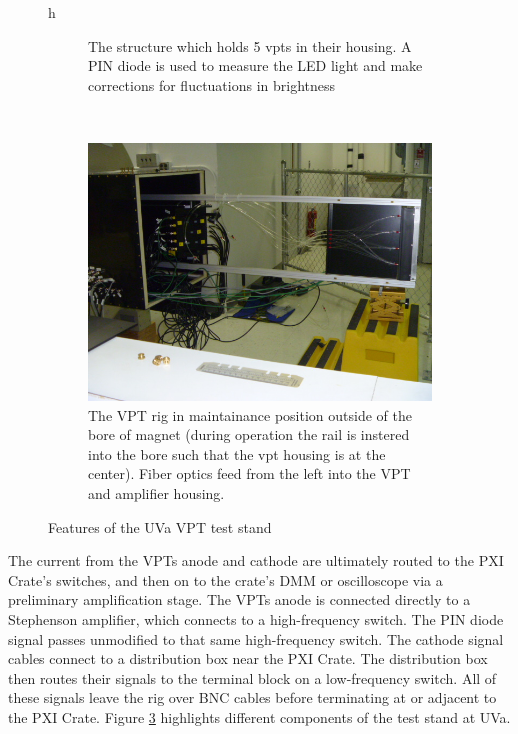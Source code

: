 \begin{figure}{h}
\begin{subfigure}[h]{0.450\textwidth}
        \caption{The structure which holds 5 vpts in their housing.
          A PIN diode is used to measure the LED light and make
          corrections for fluctuations in brightness}\label{fig:uva_vpt_rig_pin_and_house}
      \end{subfigure}
      ~ %
    \begin{subfigure}[h]{0.650\textwidth}
        \includegraphics[width=\textwidth]{Figures/CMS_Diagrams/UVaRig__Amplifier_and_Fibers.JPG}
        \caption{The VPT rig in maintainance position outside of the
          bore of magnet (during operation the rail is instered into
          the bore such that the vpt housing is at the center).  Fiber
        optics feed from the left into the VPT and amplifier housing. }\label{fig:uva_vpt_rig_pin_and_house}
      \end{subfigure}
      \caption{Features of the UVa VPT test stand}\label{fig:uva_vpt_rig}
\end{figure}


\par The current from the VPTs anode and cathode are ultimately routed
to the PXI Crate’s switches, and then on to the crate’s DMM or
oscilloscope via a preliminary amplification stage.  The VPTs anode is
connected directly to a Stephenson amplifier, which connects to a
high-frequency switch. The PIN diode signal passes unmodified to that
same high-frequency switch. The cathode signal cables connect to a
distribution box near the PXI Crate. The distribution box then routes
their signals to the terminal block on a low-frequency switch. All of
these signals leave the rig over BNC cables before terminating at or
adjacent to the PXI Crate.  Figure \ref{fig:uva_vpt_rig} highlights
different components of the test stand at UVa.   




